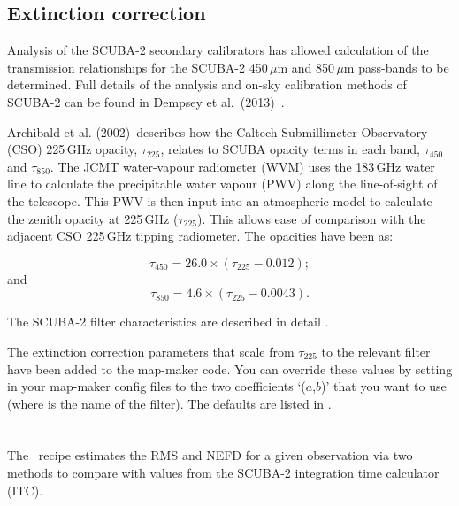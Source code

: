 \documentclass[11pt,oneside,chapters]{starlink}
\begin{document}
\section{Extinction correction}

Analysis of the SCUBA-2 secondary calibrators has allowed calculation
of the transmission relationships for the SCUBA-2 450\,$\mu$m and
850\,$\mu$m pass-bands to be determined. Full details of the analysis
and on-sky calibration methods of SCUBA-2 can be found in Dempsey et
al.\ (2013)~\cite{dempsey12}\cite{dempsey-spie}.

Archibald et al. (2002)\,\cite{archibald} describes how the Caltech
Submillimeter Observatory (CSO) 225\,GHz opacity, $\tau_{225}$,
relates to SCUBA opacity terms in each band, $\tau_{450}$ and
$\tau_{850}$. The JCMT water-vapour radiometer (WVM) uses the 183\,GHz
water line to calculate the precipitable water vapour (PWV) along the
line-of-sight of the telescope. This PWV is then input into an
atmospheric model to calculate the zenith opacity at 225\,GHz
($\tau_{225}$). This allows ease of comparison with the adjacent CSO
225\,GHz tipping radiometer. The opacities have been as:

\begin{equation}
\tau_{450} = 26.0 \times (\tau_{225} - 0.012);
\end{equation}
and
\begin{equation}
\tau_{850} = 4.6 \times (\tau_{225} - 0.0043).
\end{equation}

The SCUBA-2 filter characteristics are described in
detail .

The extinction correction parameters that scale from $\tau_{225}$ to
the relevant filter have been added to the map-maker code. You can
override these values by setting  in
your map-maker config files to the two coefficients `($a$,$b$)' that you
want to use (where  is the name of the filter). The
defaults are listed in .

\newpage
\chapter{}
\label{app:checkrmsparams}
The \picard\ recipe  estimates the RMS and
NEFD for a given observation via two methods to compare with values from
the SCUBA-2 integration time calculator (ITC).
\end{document}

